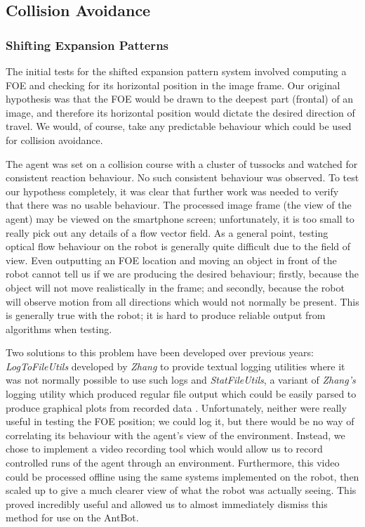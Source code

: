 \documentclass[a4paper,11pt,twoside,openright]{article}
\begin{document}
\subsection{Collision Avoidance}
\subsubsection{Shifting Expansion Patterns}
The initial tests for the shifted expansion pattern system involved computing
a FOE and checking for its horizontal position in the image frame. Our
original hypothesis was that the FOE would be drawn
to the deepest part (frontal) of an image, and therefore its horizontal position
would dictate the desired direction of travel. We would, of course, take any
predictable behaviour which could be used for collision avoidance.
\newline\par

The agent was set on a collision course with a cluster of tussocks and watched
for consistent reaction behaviour. No such consistent behaviour was observed.
To test our hypothess completely, it was clear that further work was needed to
verify that there was no usable behaviour. The processed image frame (the view
of the agent) may be viewed on the smartphone screen; unfortunately, it is too
small to really pick out any details of a flow vector field. As a general point,
testing optical flow behaviour on the robot is generally quite difficult due to
the field of view. Even outputting an FOE location and moving an object in front
of the robot cannot tell us if we are producing the desired behaviour; firstly,
because the object will not move realistically in the frame; and secondly,
because the robot will observe motion from all directions which would not
normally be present. This is generally true with the robot; it is hard to produce
reliable output from algorithms when testing.
\newline\par

Two solutions to this problem have been developed over previous years:
\textit{LogToFileUtils} developed by \textit{Zhang} to provide textual logging
utilities where it was not normally possible to use such logs \cite{Zhang2017}
and \textit{StatFileUtils}, a variant of \textit{Zhang's} logging utility which
produced regular file output which could be easily parsed to produce graphical
plots from recorded data \cite{Mitchell2018}. Unfortunately, neither were really
useful in testing the FOE position; we could log it, but there would be no way
of correlating its behaviour with the agent's view of the environment. Instead,
we chose to implement a video recording tool which would allow us to record
controlled runs of the agent through an environment. Furthermore, this video
could be processed offline using the same systems implemented on the robot, then
scaled up to give a much clearer view of what the robot was actually seeing.
This proved incredibly useful and allowed us to almost immediately dismiss this
method for use on the AntBot.
\newline\par
\end{document}
